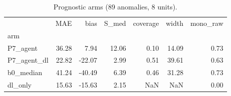 \begin{table}
\caption{Prognostic arms (89 anomalies, 8 units).}
\label{tab:prog}
\begin{tabular}{lrrrrrr}
\toprule
 & MAE & bias & S_med & coverage & width & mono_raw \\
arm &  &  &  &  &  &  \\
\midrule
P7_agent & 36.28 & 7.94 & 12.06 & 0.10 & 14.09 & 0.73 \\
P7_agent_dl & 22.82 & -22.07 & 2.99 & 0.51 & 39.61 & 0.63 \\
b0_median & 41.24 & -40.49 & 6.39 & 0.46 & 31.28 & 0.73 \\
dl_only & 15.63 & -15.63 & 2.15 & NaN & NaN & 0.00 \\
\bottomrule
\end{tabular}
\end{table}
